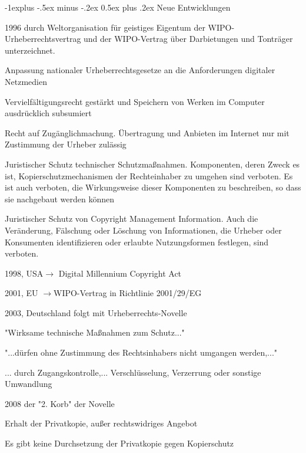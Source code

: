 \documentclass[a4paper, 8pt]{article}
\makeatletter
\renewcommand{\subsection}{\@startsection{subsection}{2}{0mm}%
                                {-1explus -.5ex minus -.2ex}%
                                {0.5ex plus .2ex}%
                                {\normalfont\normalsize\bfseries}}
\makeatother
\begin{document}
\begin{multicols*}{2}
  \subsection{Neue Entwicklungen}
  \begin{itemize*}
    \item 1996 durch Weltorganisation für geistiges Eigentum der WIPO-Urheberrechtsvertrag und der WIPO-Vertrag über Darbietungen und Tonträger unterzeichnet.
    \begin{itemize*}
      \item Anpassung nationaler Urheberrechtsgesetze an die Anforderungen digitaler Netzmedien
      \item Vervielfältigungsrecht gestärkt und Speichern von Werken im Computer ausdrücklich subsumiert
      \item Recht auf Zugänglichmachung. Übertragung und Anbieten im Internet nur mit Zustimmung der Urheber zulässig
      \item Juristischer Schutz technischer Schutzmaßnahmen. Komponenten, deren Zweck es ist, Kopierschutzmechanismen der Rechteinhaber zu umgehen sind verboten. Es ist auch verboten, die Wirkungsweise dieser Komponenten zu beschreiben, so dass sie nachgebaut werden können
      \item Juristischer Schutz von Copyright Management Information. Auch die Veränderung, Fälschung oder Löschung von Informationen, die Urheber oder Konsumenten identifizieren oder erlaubte Nutzungsformen festlegen, sind verboten.
    \end{itemize*}
    \item 1998, USA$\rightarrow$ Digital Millennium Copyright Act
    \item 2001, EU $\rightarrow$WIPO-Vertrag in Richtlinie 2001/29/EG
    \item 2003, Deutschland folgt mit Urheberrechts-Novelle
    \begin{itemize*}
      \item "Wirksame technische Maßnahmen zum Schutz..."
      \item "...dürfen ohne Zustimmung des Rechtsinhabers nicht umgangen werden,..."
      \item ... durch Zugangskontrolle,... Verschlüsselung, Verzerrung oder sonstige Umwandlung
    \end{itemize*}
    \item 2008 der "2. Korb" der Novelle
    \begin{itemize*}
      \item Erhalt der Privatkopie, außer rechtswidriges Angebot
      \item Es gibt keine Durchsetzung der Privatkopie gegen Kopierschutz
    \end{itemize*}
  \end{itemize*}


\end{multicols*}
\end{document}
